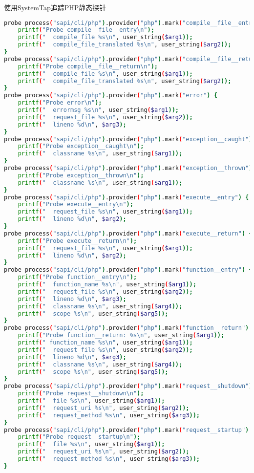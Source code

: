 \begin{example}
使用SystemTap追踪PHP静态探针
\begin{lstlisting}[language=bash]
probe process("sapi/cli/php").provider("php").mark("compile__file__entry") {
    printf("Probe compile__file__entry\n");
    printf("  compile_file %s\n", user_string($arg1));
    printf("  compile_file_translated %s\n", user_string($arg2));
}
probe process("sapi/cli/php").provider("php").mark("compile__file__return") {
    printf("Probe compile__file__return\n");
    printf("  compile_file %s\n", user_string($arg1));
    printf("  compile_file_translated %s\n", user_string($arg2));
}
probe process("sapi/cli/php").provider("php").mark("error") {
    printf("Probe error\n");
    printf("  errormsg %s\n", user_string($arg1));
    printf("  request_file %s\n", user_string($arg2));
    printf("  lineno %d\n", $arg3);
}
probe process("sapi/cli/php").provider("php").mark("exception__caught") {
    printf("Probe exception__caught\n");
    printf("  classname %s\n", user_string($arg1));
}
probe process("sapi/cli/php").provider("php").mark("exception__thrown") {
    printf("Probe exception__thrown\n");
    printf("  classname %s\n", user_string($arg1));
}
probe process("sapi/cli/php").provider("php").mark("execute__entry") {
    printf("Probe execute__entry\n");
    printf("  request_file %s\n", user_string($arg1));
    printf("  lineno %d\n", $arg2);
}
probe process("sapi/cli/php").provider("php").mark("execute__return") {
    printf("Probe execute__return\n");
    printf("  request_file %s\n", user_string($arg1));
    printf("  lineno %d\n", $arg2);
}
probe process("sapi/cli/php").provider("php").mark("function__entry") {
    printf("Probe function__entry\n");
    printf("  function_name %s\n", user_string($arg1));
    printf("  request_file %s\n", user_string($arg2));
    printf("  lineno %d\n", $arg3);
    printf("  classname %s\n", user_string($arg4));
    printf("  scope %s\n", user_string($arg5));
}
probe process("sapi/cli/php").provider("php").mark("function__return") {
    printf("Probe function__return: %s\n", user_string($arg1));
    printf(" function_name %s\n", user_string($arg1));
    printf("  request_file %s\n", user_string($arg2));
    printf("  lineno %d\n", $arg3);
    printf("  classname %s\n", user_string($arg4));
    printf("  scope %s\n", user_string($arg5));
}
probe process("sapi/cli/php").provider("php").mark("request__shutdown") {
    printf("Probe request__shutdown\n");
    printf("  file %s\n", user_string($arg1));
    printf("  request_uri %s\n", user_string($arg2));
    printf("  request_method %s\n", user_string($arg3));
}
probe process("sapi/cli/php").provider("php").mark("request__startup") {
    printf("Probe request__startup\n");
    printf("  file %s\n", user_string($arg1));
    printf("  request_uri %s\n", user_string($arg2));
    printf("  request_method %s\n", user_string($arg3));
}
\end{lstlisting}
\end{example}

